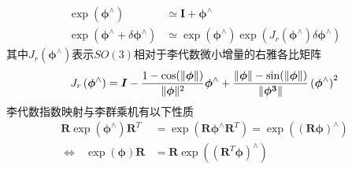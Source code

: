 \begin{equation}
\label{equ3}
\begin{aligned}
\exp\left( \boldsymbol{\phi}^{\wedge} \right) & \simeq  \boldsymbol{I} + \boldsymbol{\phi}^{\wedge}
\\
\exp\left( \boldsymbol{\phi}^{\wedge} + \delta\boldsymbol{\phi}^{\wedge}  \right) & \simeq \exp \left( \boldsymbol{\phi}^{\wedge} \right)  \exp \left( J_r\left( \boldsymbol{\phi}^{\wedge} \right) \delta\boldsymbol{\phi}^{\wedge} \right)
\end{aligned}
\end{equation}
其中$J_r\left( \boldsymbol{\phi}^{\wedge} \right)$表示$SO(3)$相对于李代数微小增量的右雅各比矩阵
\begin{equation}
\label{equ4}
J_r\left( \boldsymbol{\phi}^{\wedge} \right) = \boldsymbol{I} - {{1-\cos(\Vert \boldsymbol{\phi} \Vert)} \over \Vert \boldsymbol{\phi} \Vert^2 } \boldsymbol{\phi}^{\wedge}+
{{ \Vert \boldsymbol{\phi} \Vert-\sin(\Vert \boldsymbol{\phi} \Vert)} \over \Vert \boldsymbol{\phi^3} \Vert }\left(\boldsymbol{\phi}^{\wedge}\right)^2
\end{equation}
李代数指数映射与李群乘机有以下性质
\begin{equation}
\label{equ5}
\begin{aligned}
\boldsymbol{R} \exp \left( \boldsymbol{\phi}^{\wedge} \right) \boldsymbol{R}^T &= \exp \left( \boldsymbol{R}  \boldsymbol{\phi}^{\wedge} \boldsymbol{R}^T \right) = \exp \left( \left( \boldsymbol{R} \boldsymbol{\phi} \right)^\wedge\right)
\\ 
\Leftrightarrow \ \ \ \exp \left( \boldsymbol{\phi} \right) \boldsymbol{R} &=  \boldsymbol{R} \exp \left(\left( \boldsymbol{R}^T  \boldsymbol{\phi} \right)^\wedge\right)
\end{aligned}
\end{equation}

